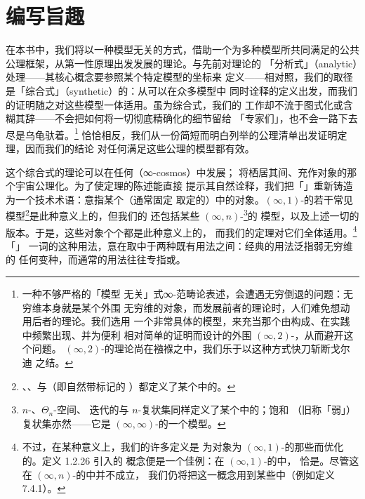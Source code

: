 \section*{编写旨趣}

在本书中，我们将以一种模型无关的方式，借助一个为多种模型所共同满足的公共
公理框架，从第一性原理出发发展\trInfinityCategory{}的理论。与先前对\trInfinityCategory{}理论的
「分析式」（analytic）处理——其核心\trCategory{}概念要参照某个特定模型的坐标来
定义——相对照，我们的取径是「综合式」（synthetic）的：从可以在众多模型中
同时诠释的定义出发，而我们的证明随之对这些模型一体适用。虽为综合式，我们的
工作却不流于图式化或含糊其辞——不会把如何将一切彻底精确化的细节留给
「专家们」，也不会一路下去尽是乌龟驮着。\footnote{一种不够严格的「模型
无关」式∞-范畴论表述，会遭遇无穷倒退的问题：无穷维\trCategory{}本身就是某个外围
无穷维\trCategory{}的对象，而发展前者的理论时，人们难免想动用后者的理论。我们选用
一个非常具体的模型，来充当那个由\trInfinityCategory{}构成、在实践中频繁出现、并为便利
相对简单的证明而设计的外围 $(\infty,2)$-\trCategory{}，从而避开这个问题。
$(\infty,2)$-\trCategory{}的理论尚在襁褓之中，我们乐于以这种方式快刀斩断戈尔迪
之结。}
恰恰相反，我们从一份简短而明白列举的公理清单出发证明定理，因而我们的结论
对任何满足这些公理的\trInfinityCategory{}模型都有效。

这个综合式的理论可以在任何\textbf{\trInfinityCosmos}（∞-cosmos）中发展；
\trInfinityCosmos{}将\trInfinityCategory{}栖居其间、充作对象的那个宇宙公理化。为了使定理的陈述能直接
提示其自然诠释，我们把「\trInfinityCategory」重新铸造为一个技术术语：意指某个（通常固定
取定的）\trInfinityCosmos{}中的对象。$(\infty,1)$-\trCategory{}的若干常见模型\footnote{
\trQuasiCategory{}、\trCompleteSegalSpaces{}、\trSegalCategories{}与\trOneComplicialSets{}（即自然带标记的%
\trQuasiCategory）都定义了某个\trInfinityCosmos{}中的\trInfinityCategory{}。}是此种意义上的\trInfinityCategory{}，但我们的%
\trInfinityCategory{}还包括某些 $(\infty,n)$-\trCategory\footnote{$n$-\trQuasiCategory{}、$\Theta_n$-空间、
迭代的\trCompleteSegalSpaces{}与 $n$-复状集同样定义了某个\trInfinityCosmos{}中的\trInfinityCategory{}；饱和
（旧称「弱」）复状集亦然——它是 $(\infty,\infty)$-\trCategory{}的一个模型。}的
模型，以及上述一切的\trFibration{}版本。于是，这些对象个个都是此种意义上的\trInfinityCategory{}，
而我们的定理对它们全体适用。\footnote{不过，在某种意义上，我们的许多定义是
为对象为 $(\infty,1)$-\trCategory{}的那些\trInfinityCosmos{}而优化的。定义 1.2.26 引入的%
\trDiscrete{}\trInfinityCategory{}概念便是一个佳例：在 $(\infty,1)$-\trCategory{}的\trInfinityCosmos{}中，
\trDiscrete\trInfinityCategory{}恰是\trInfinityGroupoid{}。尽管这在 $(\infty,n)$-\trCategory{}的\trInfinityCosmos{}中并不成立，
我们仍将把这一概念用到某些\trExotic\trInfinityCosmos{}中（例如定义 7.4.1）。}「\trInfinityCategory」
一词的这种用法，意在取中于两种既有用法之间：经典的用法泛指弱无穷维\trCategory{}的
任何变种，而通常的用法往往专指\trQuasiCategory{}或\trCompleteSegalSpaces{}。

